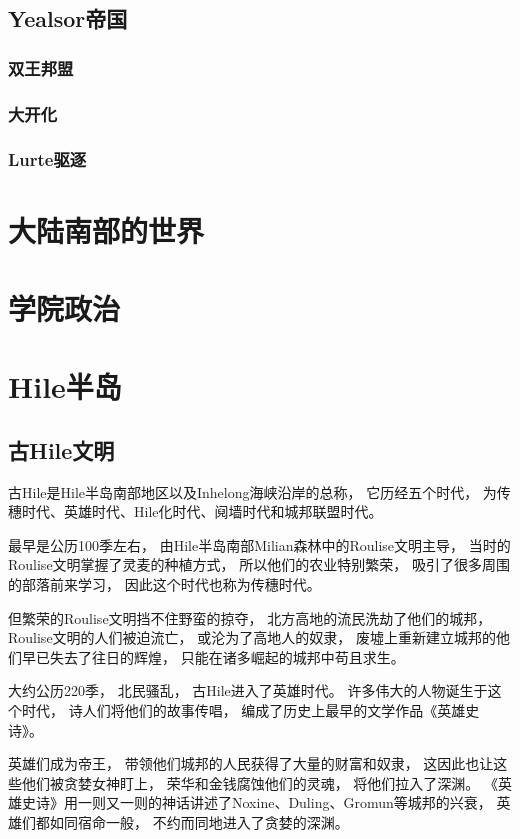 \documentclass[UTF8,12pt,draft]{ctexbook}
\begin{document}
        \section{Yealsor帝国}
            \subsection{双王邦盟}
            \subsection{大开化}
            \subsection{Lurte驱逐}
    \chapter{大陆南部的世界}
    \chapter{学院政治}
    \chapter{Hile半岛}
        \section{古Hile文明}
        古Hile是Hile半岛南部地区以及Inhelong海峡沿岸的总称，
        它历经五个时代，
        为传穗时代、英雄时代、Hile化时代、阋墙时代和城邦联盟时代。

        最早是公历100季左右，
        由Hile半岛南部Milian森林中的Roulise文明主导，
        当时的Roulise文明掌握了灵麦的种植方式，
        所以他们的农业特别繁荣，
        吸引了很多周围的部落前来学习，
        因此这个时代也称为传穗时代。

        但繁荣的Roulise文明挡不住野蛮的掠夺，
        北方高地的流民洗劫了他们的城邦，
        Roulise文明的人们被迫流亡，
        或沦为了高地人的奴隶，
        废墟上重新建立城邦的他们早已失去了往日的辉煌，
        只能在诸多崛起的城邦中苟且求生。

        大约公历220季，
        北民骚乱，
        古Hile进入了英雄时代。
        许多伟大的人物诞生于这个时代，
        诗人们将他们的故事传唱，
        编成了历史上最早的文学作品《英雄史诗》。

        英雄们成为帝王，
        带领他们城邦的人民获得了大量的财富和奴隶，
        这因此也让这些他们被贪婪女神盯上，
        荣华和金钱腐蚀他们的灵魂，
        将他们拉入了深渊。
        《英雄史诗》用一则又一则的神话讲述了Noxine、Duling、Gromun等城邦的兴衰，
        英雄们都如同宿命一般，
        不约而同地进入了贪婪的深渊。
\end{document}
